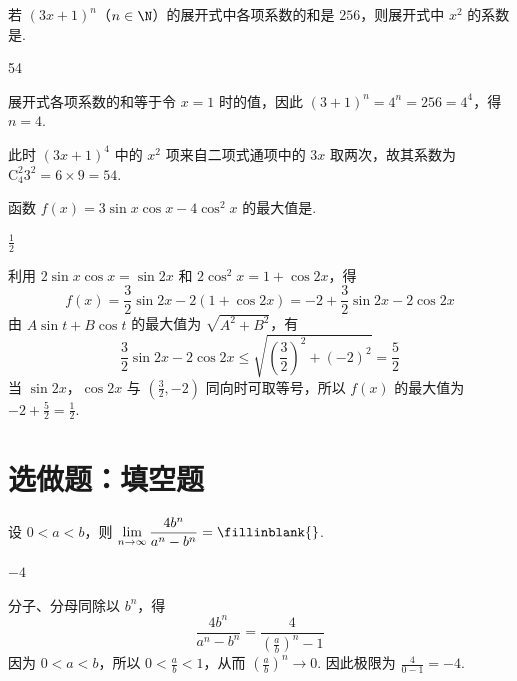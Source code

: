 \documentclass[UTF8,a4paper,oneside,11pt]{ctexbook}
\begin{document}
\begin{problem}
若 \((3x+1)^n\)（\(n \in \N\)）的展开式中各项系数的和是 \(256\)，则展开式中 \(x^2\) 的系数是\fillinblank{}.
\end{problem}

\begin{answer}
    54
\end{answer}

\begin{solution}
展开式各项系数的和等于令 \(x=1\) 时的值，因此
\((3+1)^n=4^n=256=4^4\)，得 \(n=4\).

此时 \((3x+1)^4\) 中的 \(x^2\) 项来自二项式通项中的 \(3x\) 取两次，故其系数为
\(\mathrm C_4^2 3^2=6\times9=54\).
\end{solution}

\begin{problem}
函数 \(f(x)=3\sin x\cos x-4\cos^2 x\) 的最大值是\fillinblank{}.
\end{problem}

\begin{answer}
\(\frac{1}{2}\)
\end{answer}

\begin{solution}
利用 \(2\sin x\cos x=\sin 2x\) 和 \(2\cos^2x=1+\cos 2x\)，得
\[
f(x)=\frac32\sin 2x-2(1+\cos 2x)=-2+\frac32\sin 2x-2\cos 2x
\]
由 \(A\sin t+B\cos t\) 的最大值为 \(\sqrt{A^2+B^2}\)，有
\[
\frac32\sin 2x-2\cos 2x\leqslant\sqrt{\left(\frac32\right)^2+(-2)^2}=\frac52
\]
当 \(\sin 2x\)，\(\cos 2x\) 与 \(\left(\frac32,-2\right)\) 同向时可取等号，所以 \(f(x)\) 的最大值为 \(-2+\frac52=\frac12\).
\end{solution}

\section{选做题：填空题}

\begin{problem}[A]
设 \(0<a<b\)，则 \(\displaystyle\lim_{n\to\infty}\frac{4b^n}{a^n-b^n}=\fillinblank{}\).
\end{problem}

\begin{answer}
\(-4\)
\end{answer}

\begin{solution}
分子、分母同除以 \(b^n\)，得
\[
\frac{4b^n}{a^n-b^n}=\frac{4}{\left(\frac{a}{b}\right)^n-1}
\]
因为 \(0<a<b\)，所以 \(0<\frac ab<1\)，从而 \(\left(\frac ab\right)^n\to0\). 因此极限为 \(\frac{4}{0-1}=-4\).
\end{solution}
\end{document}
